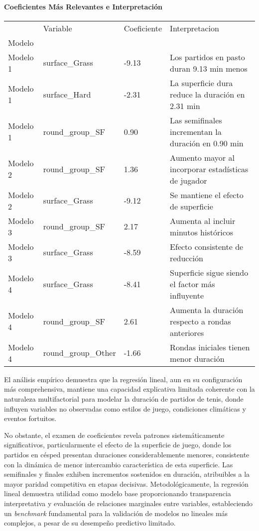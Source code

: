 \documentclass[
  letterpaper,
  DIV=11,
  numbers=noendperiod]{scrartcl}
\let\oldparagraph\paragraph
\renewcommand{\paragraph}[1]{\oldparagraph{#1}\mbox{}}
\begin{document}
\hypertarget{coeficientes-muxe1s-relevantes-e-interpretaciuxf3n}{%
\paragraph{Coeficientes Más Relevantes e
Interpretación}\label{coeficientes-muxe1s-relevantes-e-interpretaciuxf3n}}

\begin{longtable}[]{@{}llll@{}}
\toprule\noalign{}
& Variable & Coeficiente & Interpretacion \\
Modelo & & & \\
\midrule\noalign{}
\endhead
\bottomrule\noalign{}
\endlastfoot
Modelo 1 & surface\_Grass & -9.13 & Los partidos en pasto duran 9.13 min
menos \\
Modelo 1 & surface\_Hard & -2.31 & La superficie dura reduce la duración
en 2.31 min \\
Modelo 1 & round\_group\_SF & 0.90 & Las semifinales incrementan la
duración en 0.90 min \\
Modelo 2 & round\_group\_SF & 1.36 & Aumento mayor al incorporar
estadísticas de jugador \\
Modelo 2 & surface\_Grass & -9.12 & Se mantiene el efecto de
superficie \\
Modelo 3 & round\_group\_SF & 2.17 & Aumenta al incluir minutos
históricos \\
Modelo 3 & surface\_Grass & -8.59 & Efecto consistente de reducción \\
Modelo 4 & surface\_Grass & -8.41 & Superficie sigue siendo el factor
más influyente \\
Modelo 4 & round\_group\_SF & 2.61 & Aumenta la duración respecto a
rondas anteriores \\
Modelo 4 & round\_group\_Other & -1.66 & Rondas iniciales tienen menor
duración \\
\end{longtable}

El análisis empírico demuestra que la regresión lineal, aun en su
configuración más comprehensiva, mantiene una capacidad explicativa
limitada coherente con la naturaleza multifactorial para modelar la
duración de partidos de tenis, donde influyen variables no observadas
como estilos de juego, condiciones climáticas y eventos fortuitos.

No obstante, el examen de coeficientes revela patrones sistemáticamente
significativos, particularmente el efecto de la superficie de juego,
donde los partidos en césped presentan duraciones considerablemente
menores, consistente con la dinámica de menor intercambio característica
de esta superficie. Las semifinales y finales exhiben incrementos
sostenidos en duración, atribuibles a la mayor paridad competitiva en
etapas decisivas. Metodológicamente, la regresión lineal demuestra
utilidad como modelo base proporcionando transparencia interpretativa y
evaluación de relaciones marginales entre variables, estableciendo un
\emph{benchmark} fundamental para la validación de modelos no lineales
más complejos, a pesar de su desempeño predictivo limitado.
\end{document}
